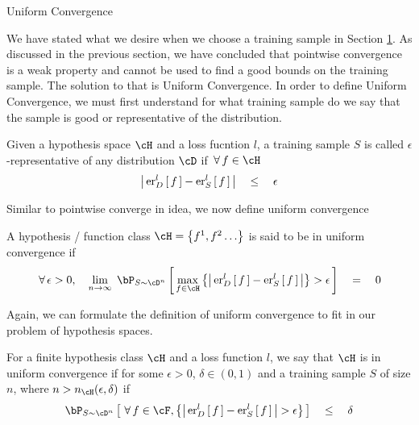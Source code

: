 \documentclass[11pt,a4paper]{article}
\begin{document}
\begin{ssection}[3]{Uniform Convergence}

	We have stated what we desire when we choose a training sample in Section \hyperlink{sec:1}{1}. As discussed in the previous section, we have concluded that pointwise convergence is a weak property and cannot be used to find a good bounds on the training sample. The solution to that is Uniform Convergence. In order to define Uniform Convergence, we must first understand for what training sample do we say that the sample is good or representative of the distribution.

	\begin{definition}
		Given a hypothesis space $\cH$ and a loss fucntion $l$, a training sample $S$ is called $\epsilon$-representative of any distribution $\cD$ if $\qforall f \in \cH$
		\begin{equation}
			\abs{\err[_D^l]{f} - \err[_S^l]{f}}	\qle	\epsilon
		\end{equation}
		\label{eq:epsilon-representative}
	\end{definition}

	Similar to pointwise converge in idea, we now define uniform convergence

	\begin{definition}
		A hypothesis / function class $\cH = \set{f^1, f^2 \dots}$ is said to be in uniform convergence if
		\begin{equation}
			\qforall \epsilon > 0, \quad \lim_{n \ra \infty}\; \prob[S \sim \cD^n]{\max_{f \in \cH} \set{\abs{\err[_D^l]{f} - \err[_S^l]{f}}} > \epsilon}	\eq	0
		\end{equation}
	\end{definition}

	Again, we can formulate the definition of uniform convergence to fit in our problem of hypothesis spaces.

	\begin{theorem}
		For a finite hypothesis class $\cH$ and a loss function $l$, we say that $\cH$ is in uniform convergence if for some $\epsilon > 0$, $\delta \in (0, 1)$ and a training sample $S$ of size $n$, where $n > n_\cH(\epsilon, \delta)$ if
		\begin{equation}
			\prob[S \sim \cD^n]{\qforall f \in \cF, \set{\abs{\err[_D^l]{f} - \err[_S^l]{f}} > \epsilon}}	\qle	\delta
		\end{equation}
		\label{thm:uniform}
	\end{theorem}


\end{ssection}
\end{document}
